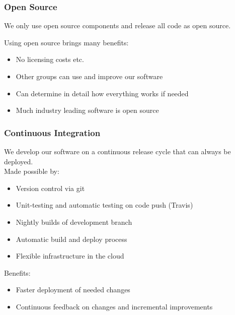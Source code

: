 \documentclass{beamer}
\begin{document}
\begin{frame}
  \frametitle{Open Source}
  We only use open source components and release all code as open source.

  \vspace{30pt}
  
  Using open source brings many benefits:

  \begin{itemize}
  \item No licensing costs etc. 
  \item Other groups can use and improve our software
  \item Can determine in detail how everything works if needed
  \item Much industry leading software is open source
  \end{itemize}

\end{frame}
\begin{frame}
  \frametitle{Continuous Integration}
  We develop our software on a continuous release cycle that can always be deployed.\\
  \vspace{5pt}
  Made possible by:
  \begin{itemize}
  \item Version control via git
  \item Unit-testing and automatic testing on code push (Travis)
  \item Nightly builds of development branch
  \item Automatic build and deploy process
  \item Flexible infrastructure in the cloud
  \end{itemize}
  \vspace{5pt}
  Benefits:
  \begin{itemize}
  \item Faster deployment of needed changes
  \item Continuous feedback on changes and incremental improvements
  \end{itemize}

\end{frame}
\end{document}
